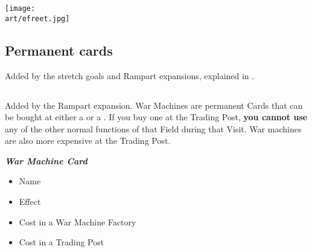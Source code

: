 
\begin{multicols*}{2}

\begin{center}
  \texttt{[image: \\art/efreet.jpg]}
\end{center}
\columnbreak

\subsection*{Permanent cards}
Added by the stretch goals and Rampart expansions, explained in .

\subsection*{}
Added by the Rampart expansion.
War Machines are permanent Cards that can be bought at either a  or a .
If you buy one at the Trading Post, \textbf{you cannot use} any of the other normal functions of that Field during that Visit.
War machines are also more expensive at the Trading Post.

{
  \bigskip
  \centering
  \begin{scriptsize}
  \end{scriptsize}

  \footnotesize
  \textbf{\textit{\textcolor{darkcandyapplered}{War Machine Card}}}
  \begin{itemize}[itemsep=0pt, parsep=5pt, topsep=0pt, partopsep=0pt]
    \item[\textbf{1.}] Name
    \item[\textbf{2.}] Effect
    \item[\textbf{3.}] Cost in a War Machine Factory
    \item[\textbf{4.}] Cost in a Trading Post
  \end{itemize}
}


\end{multicols*}
